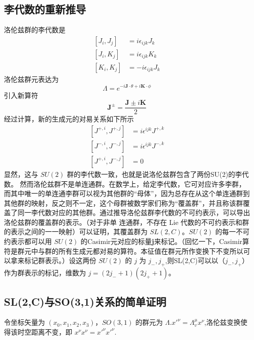 
\subsection{李代数的重新推导}
洛伦兹群的李代数是
\begin{equation}
\begin{aligned}
\left[J_{i}, J_{j}\right] &=i \epsilon_{i j k} J_{k} \\
\left[J_{i}, K_{j}\right] &=i \epsilon_{i j k} K_{k} \\
\left[K_{i}, K_{j}\right] &=-i \epsilon_{i j k} J_{k}
\end{aligned}
\end{equation}
洛伦兹群元表达为
\begin{equation}\label{qed3_eq1}
\Lambda=e^{-i \mathbf{J} \cdot \theta+i \mathbf{K} \cdot \phi}
\end{equation}
引入新算符
\begin{equation}
\mathbf{J}^{\pm}=\frac{\mathbf{J} \pm i \mathbf{K}}{2}
\end{equation}
经过计算，新的生成元的对易关系如下所示
\begin{equation}
\begin{aligned}
\left[J^{+, i}, J^{+, j}\right] &=i \epsilon^{i j k} J^{+, k} \\
\left[J^{-, i}, J^{-, j}\right] &=i \epsilon^{i j k} J^{-, k} \\
\left[J^{+, i}, J^{-, j}\right] &=0
\end{aligned}
\end{equation}
显然，这与 $SU(2)$ 群的李代数一致，也就是说洛伦兹群包含了两份SU(2)的李代数。
然而洛伦兹群不是单连通群。在数学上，给定李代数，它可对应许多李群，而其中唯一的单连通李群可以视为其他群的“母体”，因为总存在从这个单连通群到其他群的映射，反之则不一定，这个母群被数学家们称为“覆盖群”，并且称该群覆盖了同一李代数对应的其他群。通过推导洛伦兹群李代数的不可约表示，可以导出洛伦兹群的覆盖群的表示。（对于非单
连通群，不存在 Lie 代数的不可约表示和群的表示之间的一一映射）可以证明，其覆盖群为 $SL(2,C)$。$SU(2)$ 的每一不可约表示都可以用 $SU(2)$ 的Casimir元对应的标量\textbf{j}来标记。（回忆一下，Casimir算符是群元中与群的所有生成元都对易的算符。本征值在群元所作变换下不变所以可以拿来标记群表示。）设这两份 $SU(2)$ 的 $j$ 为 $j_-,j_+$,则SL(2,C)可以以（$j_-,j_+$）作为群表示的标记，维数为 $j=(2j_-+1)(2j_++1)$。

\subsection{SL(2,C)与SO(3,1)关系的简单证明}
令坐标矢量为 $(x_0,x_1,x_2,x_3)$，$SO(3,1)$ 的群元为 $\Lambda$.$x'^{\nu}=\Lambda_{v}^{\mu} x^{\nu}$,洛伦兹变换使得该时空距离不变，即 $x^\nu x^\nu=x'^\nu x'^\nu$.

